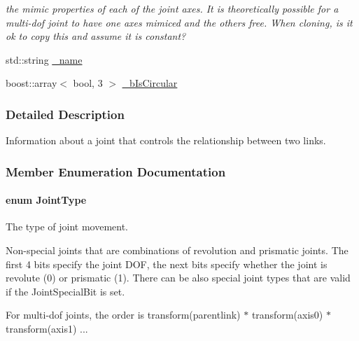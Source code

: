 \begin{DoxyCompactItemize}
\begin{DoxyCompactList}\small\item\em the mimic properties of each of the joint axes. It is theoretically possible for a multi-\/dof joint to have one axes mimiced and the others free. When cloning, is it ok to copy this and assume it is constant? \item\end{DoxyCompactList}\item 
std::string \hyperlink{classOpenRAVE_1_1KinBody_1_1Joint_aaf2ed934b37cbbd236fdd1b01a5f5005}{\_\-name}
\item 
boost::array$<$ bool, 3 $>$ \hyperlink{classOpenRAVE_1_1KinBody_1_1Joint_ac5270bc79693dd87a40cb49428f311ea}{\_\-bIsCircular}
\end{DoxyCompactItemize}


\subsubsection{Detailed Description}
Information about a joint that controls the relationship between two links. 

\subsubsection{Member Enumeration Documentation}
\hypertarget{classOpenRAVE_1_1KinBody_1_1Joint_af92f943e3dc4a7d1fb537fa481094fa9}{
\paragraph[{JointType}]{\setlength{\rightskip}{0pt plus 5cm}enum {\bf JointType}}\hfill}
\label{classOpenRAVE_1_1KinBody_1_1Joint_af92f943e3dc4a7d1fb537fa481094fa9}


The type of joint movement. 

Non-\/special joints that are combinations of revolution and prismatic joints. The first 4 bits specify the joint DOF, the next bits specify whether the joint is revolute (0) or prismatic (1). There can be also special joint types that are valid if the JointSpecialBit is set.

For multi-\/dof joints, the order is transform(parentlink) $\ast$ transform(axis0) $\ast$ transform(axis1) ... 

